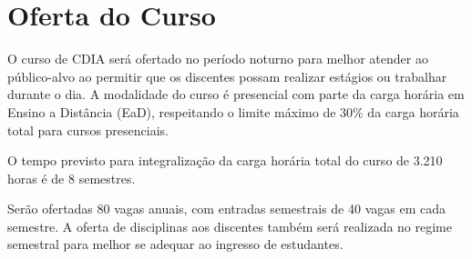 \section{Oferta do Curso}

O curso de CDIA será ofertado no período noturno para melhor atender ao público-alvo ao permitir que os discentes possam realizar estágios ou trabalhar durante o dia. A modalidade do curso é presencial com parte da carga horária em Ensino a Distância (EaD), respeitando o limite máximo de 30\% da carga horária total para cursos presenciais.

O tempo previsto para integralização da carga horária total do curso de 3.210 horas é de 8 semestres.

Serão ofertadas 80 vagas anuais, com entradas semestrais de 40 vagas em cada semestre. A oferta de disciplinas aos discentes também será realizada no regime semestral para melhor se adequar ao ingresso de estudantes.